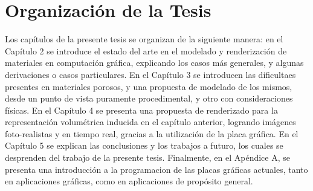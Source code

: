 \section{Organización de la Tesis}
Los capítulos de la presente tesis se organizan de la siguiente manera: en el Capítulo 2 se introduce el estado del arte en el modelado y renderización de materiales en computación gráfica, explicando los casos más generales, y algunas derivaciones o casos particulares.
En el Capítulo 3 se introducen las dificultaes presentes en materiales porosos, y una propuesta de modelado de los mismos, desde un punto de vista puramente procedimental, y otro con consideraciones físicas.
En el Capítulo 4 se presenta una propuesta de renderizado para la representación volumétrica inducida en el capítulo anterior, logrando imágenes foto-realistas y en tiempo real, gracias a la utilización de la placa gráfica.
En el Capítulo 5 se explican las conclusiones y los trabajos a futuro, los cuales se desprenden del trabajo de la presente tesis.
Finalmente, en el Apéndice A, se presenta una introducción a la programacion de las placas gráficas actuales, tanto en aplicaciones gráficas, como en aplicaciones de propósito general.

